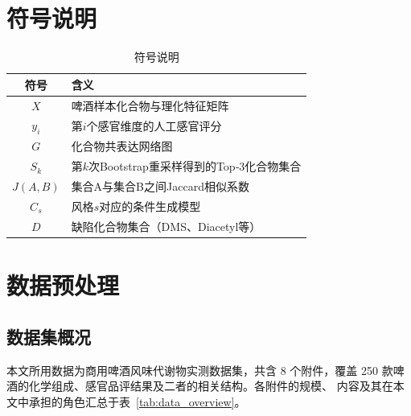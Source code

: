 \documentclass[12pt,a4paper]{article}
\begin{document}
\section{符号说明}
\begin{table}[H]
    \centering
    \begin{tabularx}{\textwidth}{c L}
        \toprule
        符号 & 含义 \\
        \midrule
        $X$ & 啤酒样本化合物与理化特征矩阵 \\
        $y_i$ & 第$i$个感官维度的人工感官评分 \\
        $G$ & 化合物共表达网络图 \\
        $S_k$ & 第$k$次Bootstrap重采样得到的Top‑3化合物集合 \\
        $J(A,B)$ & 集合A与集合B之间Jaccard相似系数 \\
        $C_s$ & 风格$s$对应的条件生成模型 \\
        $D$ & 缺陷化合物集合（DMS、Diacetyl等） \\
        \bottomrule
    \end{tabularx}
    \caption{符号说明}
\end{table}

\newcommand{\figph}[2][0.85\textwidth]{%
\fbox{\begin{minipage}[c][#1][c]{0.92\linewidth}
\centering\small\color{gray} #2\[2pt]（出图后替换为 \texttt{\textbackslash includegraphics}）
\end{minipage}}}

\section{数据预处理}

\subsection{数据集概况}

本文所用数据为商用啤酒风味代谢物实测数据集，共含 8 个附件，覆盖
250 款啤酒的化学组成、感官品评结果及二者的相关结构。各附件的规模、
内容及其在本文中承担的角色汇总于表~\ref{tab:data_overview}。
\end{document}
